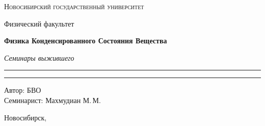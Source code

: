 \documentclass[12pt,a4paper]{report}
\begin{document}
\begin{titlepage}
    \thispagestyle{empty}

    \begin{center}
        \vspace*{1.5cm}

        {\Large\scshape Новосибирский государственный университет\par}
        \vspace{0.25cm}
        {\large Физический факультет\par}

        \vfill

        {\Huge\bfseries Физика Конденсированного Состояния Вещества\par}

        \vspace{0.45cm}

        {\Large\itshape Семинары выжившего\par}

        \vspace{0.8cm}

        \rule{0.72\linewidth}{0 pt}



        \rule{2\linewidth}{0pt}

        \vfill

        \begin{flushright}
            \large
            Автор: БВО\\[0.25cm]
            Семинарист: Махмудиан М.\,М.
        \end{flushright}

        \vspace{1.2cm}

        {\large Новосибирск, \the\year}

    \end{center}
\end{titlepage}

\tableofcontents
\newpage



\clearpage
\end{document}
